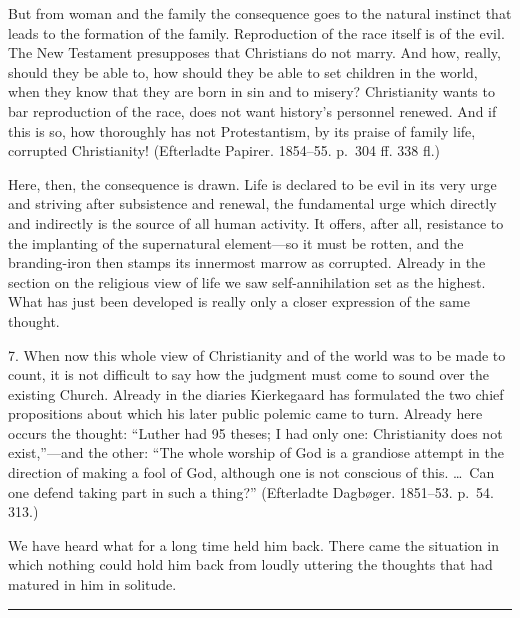 \documentclass[12pt,a4paper]{book}
\newcommand{\opage}[1]{\marginnote{\footnotesize\textit{[#1]}}}
\begin{document}
But from woman and the family the consequence goes to the natural
instinct that leads to the formation of the family.
\opage{142}Reproduction of the race itself is of the evil. The New
Testament presupposes that Christians do not marry. And how, really,
should they be able to, how should they be able to set children in the
world, when they know that they are born in sin and to misery?
Christianity wants to bar reproduction of the race, does not want
history's personnel renewed. And if this is so, how thoroughly has not
Protestantism, by its praise of family life, corrupted Christianity!
(Efterladte Papirer. 1854--55. p.~304 ff. 338 fl.)

Here, then, the consequence is drawn. Life is declared to be evil in its
very urge and striving after subsistence and renewal, the fundamental
urge which directly and indirectly is the source of all human activity.
It offers, after all, resistance to the implanting of the supernatural
element---so it must be rotten, and the branding-iron then stamps its
innermost marrow as corrupted. Already in the section on the religious
view of life we saw self-annihilation set as the highest. What has just
been developed is really only a closer expression of the same thought.

7. When now this whole view of Christianity and of the world was to be
made to count, it is not difficult to say how the judgment must come to
sound over the existing Church. Already in the diaries Kierkegaard has
formulated the two chief propositions about which his later public
polemic came to turn. Already here occurs the thought: ``Luther had 95
theses; I had only one: Christianity does not exist,''---and the other:
``The whole worship of God is a grandiose attempt in the direction of
making a fool of God, although one is not conscious of this. \dots\ Can
one defend taking part in such a thing?'' (Efterladte Dagbøger.
1851--53. p.~54. 313.)

\opage{143}We have heard what for a long time held him back. There came the
situation in which nothing could hold him back from loudly uttering the
thoughts that had matured in him in solitude.

\begin{center}\rule{3cm}{0.4pt}\end{center}
\end{document}
